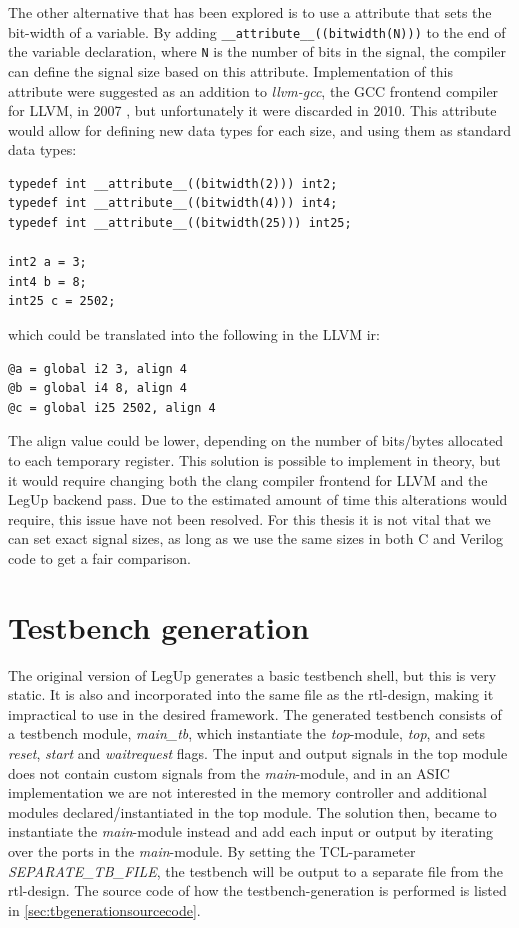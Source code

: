The other alternative that has been explored is to use a attribute that sets the bit-width of a variable. By adding \verb!__attribute__((bitwidth(N)))! to the end of the variable declaration, where \verb!N! is the number of bits in the signal, the compiler can define the signal size based on this attribute. Implementation of this attribute were suggested as an addition to \textit{llvm-gcc}, the GCC frontend compiler for LLVM, in 2007 \cite{bitwidthattr}, but unfortunately it were discarded in 2010. This attribute would allow for defining new data types for each size, and using them as standard data types:
\begin{lstlisting}
typedef int __attribute__((bitwidth(2))) int2;
typedef int __attribute__((bitwidth(4))) int4;
typedef int __attribute__((bitwidth(25))) int25;

int2 a = 3;
int4 b = 8;
int25 c = 2502;
\end{lstlisting}
which could be translated into the following in the LLVM \gls{ir}:
\begin{lstlisting}
@a = global i2 3, align 4
@b = global i4 8, align 4
@c = global i25 2502, align 4
\end{lstlisting}
The align value could be lower, depending on the number of bits/bytes allocated to each temporary register. This solution is possible to implement in theory, but it would require changing both the clang compiler frontend for LLVM and the LegUp backend pass. Due to the estimated amount of time this alterations would require, this issue have not been resolved. For this thesis it is not vital that we can set exact signal sizes, as long as we use the same sizes in both C and Verilog code to get a fair comparison.

\section{\label{subsec:tbgen}Testbench generation}
The original version of LegUp generates a basic testbench shell, but this is very static. It is also and incorporated into the same file as the \gls{rtl}-design, making it impractical to use in the desired framework. The generated testbench consists of a testbench module, \textit{main\_tb}, which instantiate the \textit{top}-module, \textit{top}, and sets \textit{reset}, \textit{start} and \textit{waitrequest} flags. The input and output signals in the top module does not contain custom signals from the \textit{main}-module, and in an ASIC implementation we are not interested in the memory controller and additional modules declared/instantiated in the top module. The solution then, became to instantiate the \textit{main}-module instead and add each input or output by iterating over the ports in the \textit{main}-module. By setting the TCL-parameter \textit{SEPARATE\_TB\_FILE}, the testbench will be output to a separate file from the \gls{rtl}-design. The source code of how the testbench-generation is performed is listed in \cref{sec:tbgenerationsourcecode}.

